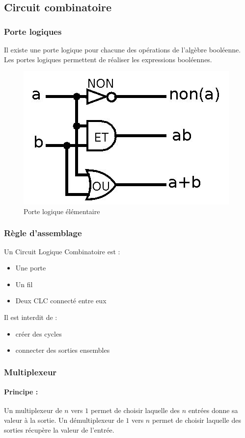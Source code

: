 \documentclass[10pt,a4paper,twoside]{article}
\begin{document}
\subsection{Circuit combinatoire}
\subsubsection{Porte logiques}
Il existe une porte logique pour chacune des opérations de l'algèbre booléenne. Les portes logiques permettent de réaliser les expressions booléennes.

\begin{figure}[hbtp]
\caption{Porte logique élémentaire}
\centering
\includegraphics[scale=0.33]{PorteLogique.jpg}
\end{figure}
\FloatBarrier

\subsubsection{Règle d'assemblage}
Un Circuit Logique Combinatoire est :
\begin{itemize}
\item Une porte
\item Un fil
\item Deux CLC connecté entre eux
\end{itemize}
Il est interdit de :
\begin{itemize}
\item créer des cycles
\item connecter des sorties ensembles
\end{itemize}

\subsubsection{Multiplexeur}
\paragraph{Principe :} Un multiplexeur de $n$ vers $1$ permet de choisir laquelle des $n$ entrées donne sa valeur à la sortie. Un démultiplexeur de $1$ vers $n$ permet de choisir laquelle des sorties récupère la valeur de l'entrée.
\end{document}
